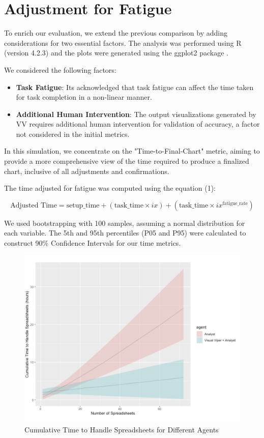\section{Adjustment for Fatigue}\label{adjustment-for-fatigue}

To enrich our evaluation, we extend the previous comparison by adding
considerations for two essential factors. The analysis was performed
using R (version 4.2.3)
\cite{41} and the plots were
generated using the ggplot2 package
\cite{13}.

We considered the following factors:

\begin{itemize}
\item
  \textbf{Task Fatigue}: It\textquotesingle s acknowledged that task
  fatigue can affect the time taken for task completion in a non-linear
  manner.
\item
  \textbf{Additional Human Intervention}: The output visualizations
  generated by VV requires additional human intervention for validation
  of accuracy, a factor not considered in the initial metrics.
\end{itemize}

In this simulation, we concentrate on the "Time-to-Final-Chart" metric,
aiming to provide a more comprehensive view of the time required to
produce a finalized chart, inclusive of all adjustments and
confirmations.

The time adjusted for fatigue was computed using the equation (1):

\begin{equation}
  \text{Adjusted Time} = \text{setup\_time} + (\text{task\_time} \times ix) + (\text{task\_time} \times ix^{\text{fatigue\_rate}})
\end{equation}

We used bootstrapping with 100 samples, assuming a normal distribution
for each variable. The 5th and 95th percentiles (P05 and P95) were
calculated to construct 90\% Confidence Intervals for our time metrics.

\begin{figure}[!ht]
  \centering
  \includegraphics[width=\textwidth]{media/fig19.png}
  \caption{Cumulative Time to Handle Spreadsheets for Different Agents}
  \label{fig:time_sim}
\end{figure}

